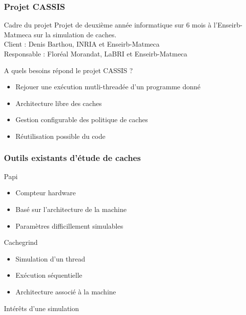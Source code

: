 \begin{frame}
  \frametitle{Projet CASSIS}
  \begin{block}{Cadre du projet}
    Projet de deuxième année informatique sur 6 mois à l'Enseirb-Matmeca sur la simulation de caches.\\
    Client : Denis Barthou, INRIA et Enseirb-Matmeca\\
    Responsable : Floréal Morandat, LaBRI et Enseirb-Matmeca
  \end{block}
  \begin{block}{A quels besoins répond le projet CASSIS ?}
  \begin{itemize}  
  \item Rejouer une exécution mutli-threadée d'un programme donné
  \item Architecture libre des caches
  \item Gestion configurable des politique de caches 
  \item Réutilisation possible du code
  \end{itemize}
  \end{block}
\end{frame}

\begin{frame}
  \frametitle{Outils existants d'étude de caches}
  \begin{block}{Papi}
  \begin{itemize}
    \item Compteur hardware
    \item Basé sur l'architecture de la machine
    \item Paramètres difficillement simulables
    \end{itemize}    
  \end{block}
  \begin{block}{Cachegrind}
    \begin{itemize}
    \item Simulation d'un thread
    \item Exécution séquentielle
    \item Architecture associé à la machine
    \end{itemize}
  \end{block}   

  \begin{block}{Intérêts d'une simulation}
  \end{block}
\end{frame}



